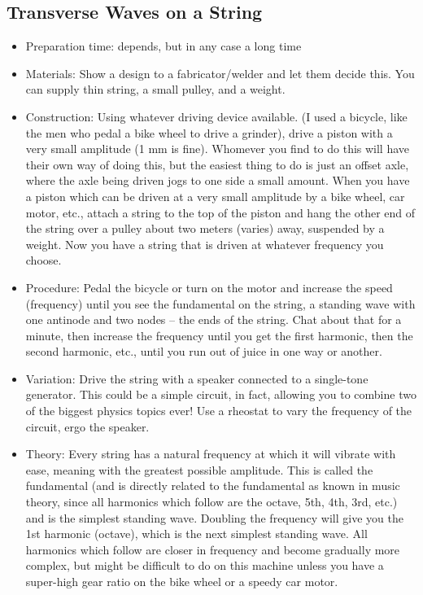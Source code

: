 \subsection{Transverse Waves on a String}
\begin{itemize}
\item{Preparation time: depends, but in any case a long time}
\item{Materials: Show a design to a fabricator/welder and let them decide this. You can supply thin string, a small pulley, and a weight.}
\item{Construction: Using whatever driving device available. (I used a bicycle, like the men who pedal a bike wheel to drive a grinder), drive a piston with a very small amplitude (1 mm is fine). Whomever you find to do this will have their own way of doing this, but the easiest thing to do is just an offset axle, where the axle being driven jogs to one side a small amount. When you have a piston which can be driven at a very small amplitude by a bike wheel, car motor, etc., attach a string to the top of the piston and hang the other end of the string over a pulley about two meters (varies) away, suspended by a weight. Now you have a string that is driven at whatever frequency you choose.}
\item{Procedure: Pedal the bicycle or turn on the motor and increase the speed (frequency) until you see the fundamental on the string, a standing wave with one antinode and two nodes – the ends of the string. Chat about that for a minute, then increase the frequency until you get the first harmonic, then the second harmonic, etc., until you run out of juice in one way or another.}
\item{Variation: Drive the string with a speaker connected to a single-tone generator. This could be a simple circuit, in fact, allowing you to combine two of the biggest physics topics ever! Use a rheostat to vary the frequency of the circuit, ergo the speaker.}
\item{Theory: Every string has a natural frequency at which it will vibrate with ease, meaning with the greatest possible amplitude. This is called the fundamental (and is directly related to the fundamental as known in music theory, since all harmonics which follow are the octave, 5th, 4th, 3rd, etc.) and is the simplest standing wave. Doubling the frequency will give you the 1st harmonic (octave), which is the next simplest standing wave. All harmonics which follow are closer in frequency and become gradually more complex, but might be difficult to do on this machine unless you have a super-high gear ratio on the bike wheel or a speedy car motor.}
\end{itemize}
	
